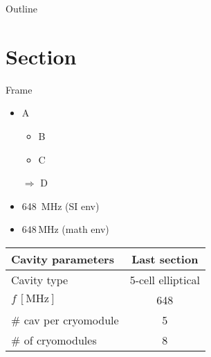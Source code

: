 


\usepackage[
   french,
   english,
]{babel} %
% 


\maketitle

\begin{frame}[noframenumbering]{Outline}
	\tableofcontents
\end{frame}

\section{Section}
\begin{frame}{Frame}
	\begin{itemize}
		\item A
		      \begin{itemize}
			      \item B
			      \item C
		      \end{itemize}
		\item[\( \Rightarrow \)] D
		\item \SI{648}{\MHz} (SI env)
		\item \( 648\,\mathrm{MHz} \) (math env)
	\end{itemize}
	\begin{table}[hbtp]
		\centering
		\begin{tabular}{@{} l c @{}}
			\toprule
			Cavity parameters     & Last section      \\
			\midrule
			Cavity type           & 5-cell elliptical \\
			\( f\,[\si{\MHz}]\)   & \num{648}         \\
			\# cav per cryomodule & \num{5}           \\
			\# of cryomodules     & 8                 \\
			\bottomrule
		\end{tabular}
	\end{table}
\end{frame}





